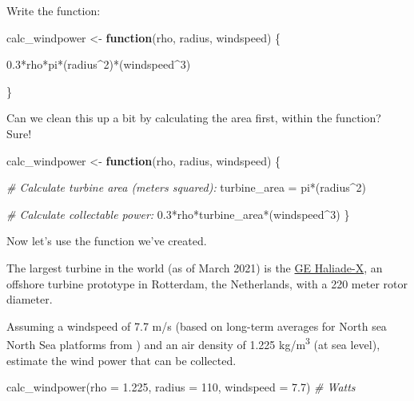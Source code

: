 \documentclass[
]{book}
\newenvironment{Shaded}{\begin{snugshade}}{\end{snugshade}}
\newcommand{\AttributeTok}[1]{\textcolor[rgb]{0.77,0.63,0.00}{#1}}
\newcommand{\CommentTok}[1]{\textcolor[rgb]{0.56,0.35,0.01}{\textit{#1}}}
\newcommand{\ControlFlowTok}[1]{\textcolor[rgb]{0.13,0.29,0.53}{\textbf{#1}}}
\newcommand{\DecValTok}[1]{\textcolor[rgb]{0.00,0.00,0.81}{#1}}
\newcommand{\FloatTok}[1]{\textcolor[rgb]{0.00,0.00,0.81}{#1}}
\newcommand{\FunctionTok}[1]{\textcolor[rgb]{0.00,0.00,0.00}{#1}}
\newcommand{\NormalTok}[1]{#1}
\newcommand{\OtherTok}[1]{\textcolor[rgb]{0.56,0.35,0.01}{#1}}
\newcommand{\SpecialCharTok}[1]{\textcolor[rgb]{0.00,0.00,0.00}{#1}}
\begin{document}
Write the function:

\begin{Shaded}
\begin{Highlighting}[]
\NormalTok{calc\_windpower }\OtherTok{\textless{}{-}} \ControlFlowTok{function}\NormalTok{(rho, radius, windspeed) \{}
  
  \FloatTok{0.3}\SpecialCharTok{*}\NormalTok{rho}\SpecialCharTok{*}\NormalTok{pi}\SpecialCharTok{*}\NormalTok{(radius}\SpecialCharTok{\^{}}\DecValTok{2}\NormalTok{)}\SpecialCharTok{*}\NormalTok{(windspeed}\SpecialCharTok{\^{}}\DecValTok{3}\NormalTok{)}
  
\NormalTok{\}}
\end{Highlighting}
\end{Shaded}

Can we clean this up a bit by calculating the area first, within the function? Sure!

\begin{Shaded}
\begin{Highlighting}[]
\NormalTok{calc\_windpower }\OtherTok{\textless{}{-}} \ControlFlowTok{function}\NormalTok{(rho, radius, windspeed) \{}
 
  \CommentTok{\# Calculate turbine area (meters squared):}
\NormalTok{  turbine\_area }\OtherTok{=}\NormalTok{ pi}\SpecialCharTok{*}\NormalTok{(radius}\SpecialCharTok{\^{}}\DecValTok{2}\NormalTok{)}
  
  \CommentTok{\# Calculate collectable power:}
  \FloatTok{0.3}\SpecialCharTok{*}\NormalTok{rho}\SpecialCharTok{*}\NormalTok{turbine\_area}\SpecialCharTok{*}\NormalTok{(windspeed}\SpecialCharTok{\^{}}\DecValTok{3}\NormalTok{)}
\NormalTok{\}}
\end{Highlighting}
\end{Shaded}

Now let's use the function we've created.

The largest turbine in the world (as of March 2021) is the \href{https://www.ge.com/renewableenergy/wind-energy/offshore-wind/haliade-x-offshore-turbine}{GE Haliade-X}, an offshore turbine prototype in Rotterdam, the Netherlands, with a 220 meter rotor diameter.

Assuming a windspeed of 7.7 m/s (based on long-term averages for North sea North Sea platforms from \citet{coelingh_analysis_1998}) and an air density of 1.225 kg/m\textsuperscript{3} (at sea level), estimate the wind power that can be collected.

\begin{Shaded}
\begin{Highlighting}[]
\FunctionTok{calc\_windpower}\NormalTok{(}\AttributeTok{rho =} \FloatTok{1.225}\NormalTok{, }\AttributeTok{radius =} \DecValTok{110}\NormalTok{, }\AttributeTok{windspeed =} \FloatTok{7.7}\NormalTok{) }\CommentTok{\# Watts}
\end{Highlighting}
\end{Shaded}
\end{document}
